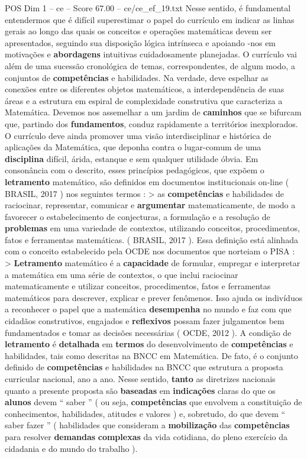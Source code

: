 \begin{textsample}{POS Dim 1 – ce – Score 67.00 – ce/ce\_ef\_19.txt}
Nesse sentido, é fundamental entendermos que é difícil superestimar o papel do currículo em indicar as linhas gerais ao longo das quais os conceitos e operações matemáticas devem ser apresentados, seguindo sua disposição lógica intrínseca e apoiando -nos em motivações e \textbf{abordagens} intuitivas cuidadosamente planejadas.
O currículo vai além de uma sucessão cronológica de temas, correspondentes, de algum modo, a conjuntos de \textbf{competências} e habilidades.
Na verdade, deve espelhar as conexões entre os diferentes objetos matemáticos, a interdependência de suas áreas e a estrutura em espiral de complexidade construtiva que caracteriza a Matemática.
Devemos nos assemelhar a um jardim de \textbf{caminhos} que se bifurcam que, partindo dos \textbf{fundamentos}, conduz rapidamente a territórios inexplorados.
O currículo deve ainda promover uma visão interdisciplinar e histórica de aplicações da Matemática, que deponha contra o lugar-comum de uma \textbf{disciplina} difícil, árida, estanque e sem qualquer utilidade óbvia.
Em consonância com o descrito, esses princípios pedagógicos, que expõem o \textbf{letramento} matemático, são definidos em documentos institucionais on-line ( BRASIL, 2017 ) nos seguintes termos : > as \textbf{competências} e habilidades de raciocinar, representar, comunicar e \textbf{argumentar} matematicamente, de modo a favorecer o estabelecimento de conjecturas, a formulação e a resolução de \textbf{problemas} em uma variedade de contextos, utilizando conceitos, procedimentos, fatos e ferramentas matemáticas. ( BRASIL, 2017 ).
Essa definição está alinhada com o conceito estabelecido pela OCDE nos documentos que norteiam o PISA : > \textbf{Letramento} matemático é a \textbf{capacidade} de formular, empregar e interpretar a matemática em uma série de contextos, o que inclui raciocinar matematicamente e utilizar conceitos, procedimentos, fatos e ferramentas matemáticos para descrever, explicar e prever fenômenos.
Isso ajuda os indivíduos a reconhecer o papel que a matemática \textbf{desempenha} no mundo e faz com que cidadãos construtivos, engajados e \textbf{reflexivos} possam fazer julgamentos bem fundamentados e tomar as decisões necessárias ( OCDE, 2012 ).
A condição de \textbf{letramento} é \textbf{detalhada} em \textbf{termos} do desenvolvimento de \textbf{competências} e habilidades, tais como descritas na BNCC em Matemática.
De fato, é o conjunto definido de \textbf{competências} e habilidades na BNCC que estrutura a proposta curricular nacional, ano a ano.
Nesse sentido, \textbf{tanto} as diretrizes nacionais quanto a presente proposta são \textbf{baseadas} em \textbf{indicações} claras do que os \textbf{alunos} devem “ saber ” ( ou seja, \textbf{competências} que envolvem a constituição de conhecimentos, habilidades, atitudes e valores ) e, sobretudo, do que devem “ saber fazer ” ( habilidades que consideram a \textbf{mobilização} das \textbf{competências} para resolver \textbf{demandas} \textbf{complexas} da vida cotidiana, do pleno exercício da cidadania e do mundo do trabalho ).

\end{textsample}
